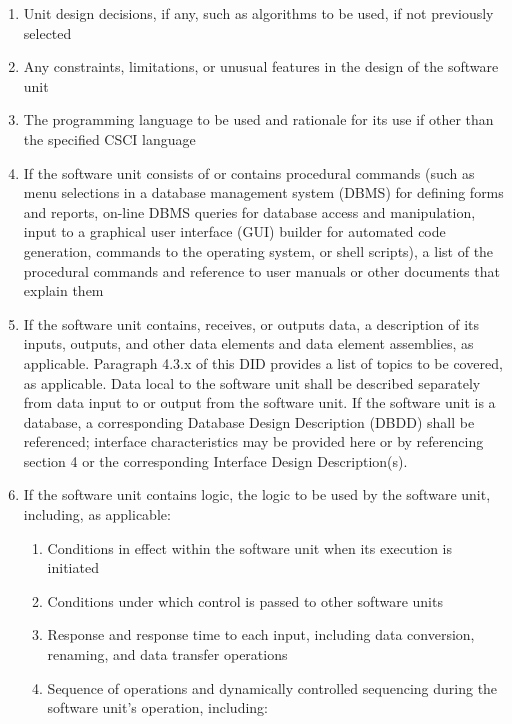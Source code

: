 \begin{enumerate}
\itemsep1pt\parskip0pt
\item
  Unit design decisions, if any, such as algorithms to be used, if not
  previously selected
\item
  Any constraints, limitations, or unusual features in the design of the
  software unit
\item
  The programming language to be used and rationale for its use if other
  than the specified CSCI language
\item
  If the software unit consists of or contains procedural commands (such
  as menu selections in a database management system (DBMS) for defining
  forms and reports, on-line DBMS queries for database access and
  manipulation, input to a graphical user interface (GUI) builder for
  automated code generation, commands to the operating system, or shell
  scripts), a list of the procedural commands and reference to user
  manuals or other documents that explain them
\item
  If the software unit contains, receives, or outputs data, a
  description of its inputs, outputs, and other data elements and data
  element assemblies, as applicable. Paragraph 4.3.x of this DID
  provides a list of topics to be covered, as applicable. Data local to
  the software unit shall be described separately from data input to or
  output from the software unit. If the software unit is a database, a
  corresponding Database Design Description (DBDD) shall be referenced;
  interface characteristics may be provided here or by referencing
  section 4 or the corresponding Interface Design Description(s).
\item
  If the software unit contains logic, the logic to be used by the
  software unit, including, as applicable:

  \begin{enumerate}
  \itemsep1pt\parskip0pt
  \item
    Conditions in effect within the software unit when its execution is
    initiated
  \item
    Conditions under which control is passed to other software units
  \item
    Response and response time to each input, including data conversion,
    renaming, and data transfer operations
  \item
    Sequence of operations and dynamically controlled sequencing during
    the software unit's operation, including:


\end{enumerate}
\end{enumerate}
